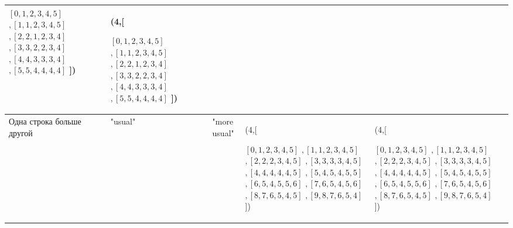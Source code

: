 \documentclass[12pt]{report}
\begin{document}
\begin{center}
\begin{longtable}[H]{|p{2cm}|p{1.5cm}|p{1.5cm}|p{4.7cm}|p{4.7cm}|c|}
	$[0,1,2,3,4,5]$
	$,[1,1,2,3,4,5]$
	$,[2,2,1,2,3,4]$
	$,[3,3,2,2,3,4]$
	$,[4,4,3,3,3,4]$
	$,[5,5,4,4,4,4]$
	]) & (4,[
	
	$[0,1,2,3,4,5]$
	$,[1,1,2,3,4,5]$
	$,[2,2,1,2,3,4]$
	$,[3,3,2,2,3,4]$
	$,[4,4,3,3,3,4]$
	$,[5,5,4,4,4,4]$
	]) & \checkmark\\
	\hline
	Одна строка больше другой & "usual" & "more
	usual" & (4,[
	
	$[0,1,2,3,4,5]$
	$,[1,1,2,3,4,5]$
	$,[2,2,2,3,4,5]$
	$,[3,3,3,3,4,5]$
	$,[4,4,4,4,4,5]$
	$,[5,4,5,4,5,5]$
	$,[6,5,4,5,5,6]$
	$,[7,6,5,4,5,6]$
	$,[8,7,6,5,4,5]$
	$,[9,8,7,6,5,4]$
	]) & (4,[
	
	$[0,1,2,3,4,5]$
	$,[1,1,2,3,4,5]$
	$,[2,2,2,3,4,5]$
	$,[3,3,3,3,4,5]$
	$,[4,4,4,4,4,5]$
	$,[5,4,5,4,5,5]$
	$,[6,5,4,5,5,6]$
	$,[7,6,5,4,5,6]$
	$,[8,7,6,5,4,5]$
	$,[9,8,7,6,5,4]$
	]) & \checkmark\\
	\hline
\end{longtable}
\end{center}

\newpage
\end{document}
